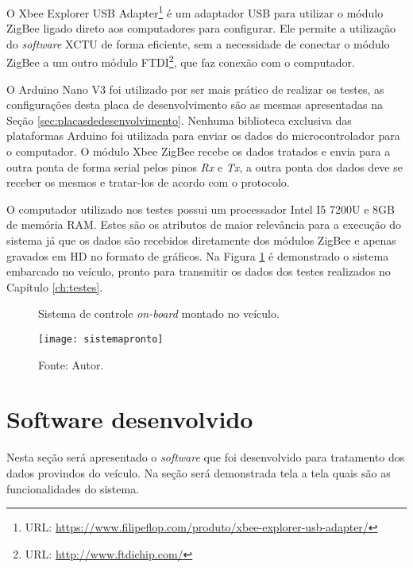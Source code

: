 O Xbee Explorer USB Adapter\footnote[1]{URL: \url{https://www.filipeflop.com/produto/xbee-explorer-usb-adapter/}} é um adaptador USB para utilizar o módulo ZigBee ligado direto aos computadores para configurar. Ele permite a utilização do \textit{software} XCTU de forma eficiente, sem a necessidade de conectar o módulo ZigBee a um outro módulo FTDI\footnote[2]{URL: \url{http://www.ftdichip.com/}}, que faz conexão com o computador. 

O Arduino Nano V3 foi utilizado por ser mais prático de realizar os testes, as configurações desta placa de desenvolvimento são as mesmas apresentadas na Seção \ref{sec:placasdedesenvolvimento}. Nenhuma biblioteca exclusiva das plataformas Arduino foi utilizada para enviar os dados do microcontrolador para o computador. O módulo Xbee ZigBee recebe os dados tratados e envia para a outra ponta de forma serial pelos pinos \textit{Rx} e \textit{Tx}, a outra ponta dos dados deve se receber os mesmos e tratar-los de acordo com o protocolo.

O computador utilizado nos testes possui um processador Intel I5 7200U e 8GB de memória RAM. Estes são os atributos de maior relevância para a execução do sistema já que os dados são recebidos diretamente dos módulos ZigBee e apenas gravados em HD no formato de gráficos. Na Figura \ref{fig:sistemapronto} é demonstrado o sistema embarcado no veículo, pronto para transmitir os dados dos testes realizados no Capítulo \ref{ch:testes}. 

\begin{figure}[!htb]
	\centering
		\caption{Sistema de controle \textit{on-board} montado no veículo.}
		\texttt{[image: sistemapronto]} 
		\caption*{Fonte: Autor.}
		\label{fig:sistemapronto}
\end{figure}    


\section {Software desenvolvido}
Nesta seção será apresentado o \textit{software} que foi desenvolvido para tratamento dos dados provindos do veículo. Na seção será demonstrada tela a tela quais são as funcionalidades do sistema.

